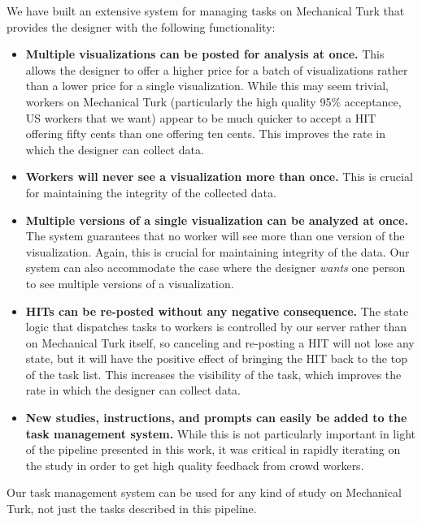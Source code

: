 \documentclass{sigchi}
\begin{document}
We have built an extensive system for managing tasks on Mechanical
Turk that provides the designer with the following functionality:

\begin{itemize}
  \item \textbf{Multiple visualizations can be posted for analysis at once.}
  This allows the designer to offer a higher price for a batch of
  visualizations rather than a lower price for a single visualization.
  While this may seem trivial, workers on Mechanical Turk
  (particularly the high quality 95\% acceptance, US workers that we
  want) appear to be much quicker to accept a HIT offering fifty cents
  than one offering ten cents. This improves the rate in which the
  designer can collect data.
  \item \textbf{Workers will never see a visualization more than
  once.} This is crucial for maintaining the integrity of the
  collected data.
  \item \textbf{Multiple versions of a single visualization can be analyzed at
  once.} The system guarantees that no worker will see more than one
  version of the visualization. Again, this is crucial for maintaining
  integrity of the data. Our system can also accommodate the case
  where the designer \textit{wants} one person to see multiple
  versions of a visualization.
  \item \textbf{HITs can be re-posted without any negative
  consequence.} The state logic that dispatches tasks to workers is
  controlled by our server rather than on Mechanical Turk itself, so
  canceling and re-posting a HIT will not lose any state, but it will
  have the positive effect of bringing the HIT back to the top of the
  task list. This increases the visibility of the task, which improves
  the rate in which the designer can collect data.
  \item \textbf{New studies, instructions, and prompts can easily be
  added to the task management system.} While this is not particularly
  important in light of the pipeline presented in this work, it was
  critical in rapidly iterating on the study in order to get high
  quality feedback from crowd workers.
\end{itemize}

Our task management system can be used for any kind of study on
Mechanical Turk, not just the tasks described in this pipeline.
\end{document}
